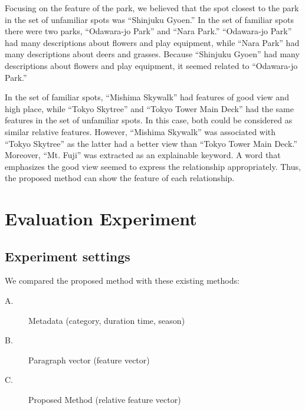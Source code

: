 \documentclass[journal]{IAENGtran}
\begin{document}
Focusing on the feature of the park, we believed that the spot closest to the park in the set of unfamiliar spots was ``Shinjuku Gyoen.''
In the set of familiar spots there were two parks, ``Odawara-jo Park'' and ``Nara Park.''
``Odawara-jo Park'' had many descriptions about flowers and play equipment, while ``Nara Park'' had many descriptions about deers and grasses.
Because ``Shinjuku Gyoen'' had many descriptions about flowers and play equipment, it seemed related to ``Odawara-jo Park.''

In the set of familiar spots, ``Mishima Skywalk'' had features of good view and high place, while ``Tokyo Skytree'' and ``Tokyo Tower Main Deck'' had the same features in the set of unfamiliar spots.
In this case, both could be considered as similar relative features.
However, ``Mishima Skywalk'' was associated with ``Tokyo Skytree'' as the latter had a better view than ``Tokyo Tower Main Deck.''
Moreover, ``Mt. Fuji'' was extracted as an explainable keyword. A word that emphasizes the good view seemed to express the relationship appropriately.
Thus, the proposed method can show the feature of each relationship.


\section{Evaluation Experiment}
\label{sec:Evaluation Experiment}
\subsection{Experiment settings}
\label{subsec:Experiment settings}
We compared the proposed method with these existing methods:
\begin{description}
  \item[A.]Metadata (category, duration time, season)
  \item[B.]Paragraph vector (feature vector)
  \item[C.]Proposed Method (relative feature vector)
\end{description}
\end{document}
